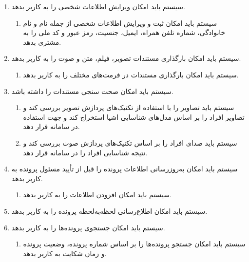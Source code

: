 \documentclass[12pt,a4paper,oneside]{article}
\begin{document}
\begin{itemize}
\begin{enumerate}
        \item 
        سیستم باید امکان ویرایش اطلاعات شخصى را به کاربر بدهد.
        \begin{enumerate}
            \renewcommand{\labelenumii}{\textbf{.R\arabic{enumi}.\arabic{enumii}}}
            \item 
            سیستم باید امکان ثبت و ویرایش اطلاعات شخصى از جمله نام و نام خانوادگی، شماره تلفن همراه، ایمیل، جنسیت، رمز عبور و کد ملى را به مشتری بدهد.
        \end{enumerate}

        \item 
        سیستم باید امکان بارگذاری مستندات تصویر، فیلم، متن و صوت را به کاربر بدهد.
        \begin{enumerate}
            \renewcommand{\labelenumii}{\textbf{.R\arabic{enumi}.\arabic{enumii}}}
            \item 
            سیستم باید امکان بارگذاری مستندات در فرمت‌های مختلف را به کاربر بدهد.
        \end{enumerate}

        \item 
        سیستم باید امکان صحت سنجی مستندات را داشته باشد.
        \begin{enumerate}
            \renewcommand{\labelenumii}{\textbf{.R\arabic{enumi}.\arabic{enumii}}}
            \item 
            سیستم باید تصاویر را با استفاده از تکنیک‌های پردازش تصویر بررسی کند و تصاویر افراد را بر اساس مدل‌های شناسایی اشیا استخراج کند و جهت استفاده در سامانه قرار دهد.
            \item 
            سیستم باید صدای افراد را بر اساس تکنیک‌های پردازش صوت بررسی کند و نتیجه شناسایی افراد را در سامانه قرار دهد.
        \end{enumerate}

        \item 
        سیستم باید امکان به‌روزرسانی اطلاعات پرونده را قبل از تأیید مسئول پرونده به کاربر بدهد.
        \begin{enumerate}
            \renewcommand{\labelenumii}{\textbf{.R\arabic{enumi}.\arabic{enumii}}}
            \item 
            سیستم باید امکان افزودن اطلاعات را به کاربر بدهد.
        \end{enumerate}

        \item 
        سیستم باید امکان اطلاع‌رسانی لحظه‌به‌لحظه پرونده را به کاربر بدهد.

        \item 
        سیستم باید امکان جستجوی پرونده‌ها را به کاربر بدهد.
        \begin{enumerate}
            \renewcommand{\labelenumii}{\textbf{.R\arabic{enumi}.\arabic{enumii}}}
            \item 
            سیستم باید امکان جستجو پرونده‌ها را بر اساس شماره پرونده، وضعیت پرونده و زمان شکایت به کاربر بدهد.
        \end{enumerate}


\end{enumerate}
\end{itemize}
\end{document}
